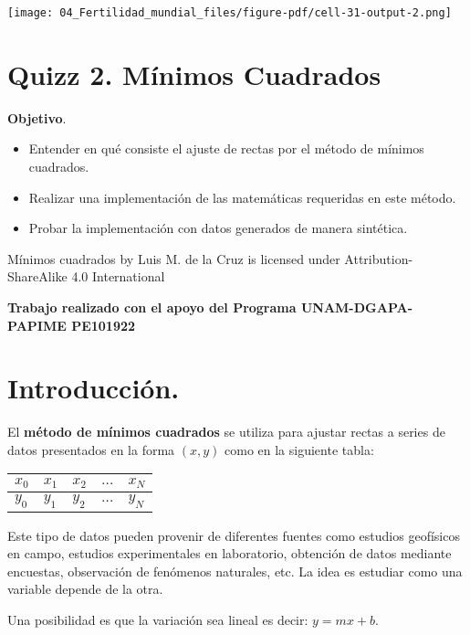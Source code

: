 \documentclass[
  letterpaper,
  DIV=11,
  numbers=noendperiod]{scrreprt}
\providecommand{\tightlist}{%
  \setlength{\itemsep}{0pt}\setlength{\parskip}{0pt}}\usepackage{longtable,booktabs,array}
\begin{document}
\texttt{[image: 04\_Fertilidad\_mundial\_files/figure-pdf/cell-31-output-2.png]}


\chapter{Quizz 2. Mínimos
Cuadrados}\label{quizz-2.-muxednimos-cuadrados}

\textbf{Objetivo}.

\begin{itemize}
\tightlist
\item
  Entender en qué consiste el ajuste de rectas por el método de mínimos
  cuadrados.
\item
  Realizar una implementación de las matemáticas requeridas en este
  método.
\item
  Probar la implementación con datos generados de manera sintética.
\end{itemize}

Mínimos cuadrados by Luis M. de la Cruz is licensed under
Attribution-ShareAlike 4.0 International

\textbf{Trabajo realizado con el apoyo del Programa UNAM-DGAPA-PAPIME
PE101922}


\chapter{Introducción.}\label{introducciuxf3n.}

El \textbf{método de mínimos cuadrados} se utiliza para ajustar rectas a
series de datos presentados en la forma \((x, y)\) como en la siguiente
tabla:

\begin{longtable}[]{@{}lllll@{}}
\toprule\noalign{}
\(x_0\) & \(x_1\) & \(x_2\) & \(\dots\) & \(x_N\) \\
\midrule\noalign{}
\endhead
\bottomrule\noalign{}
\endlastfoot
\(y_0\) & \(y_1\) & \(y_2\) & \(\dots\) & \(y_N\) \\
\end{longtable}

Este tipo de datos pueden provenir de diferentes fuentes como estudios
geofísicos en campo, estudios experimentales en laboratorio, obtención
de datos mediante encuestas, observación de fenómenos naturales, etc. La
idea es estudiar como una variable depende de la otra.

Una posibilidad es que la variación sea lineal es decir:
\(y = m x + b\).
\end{document}
